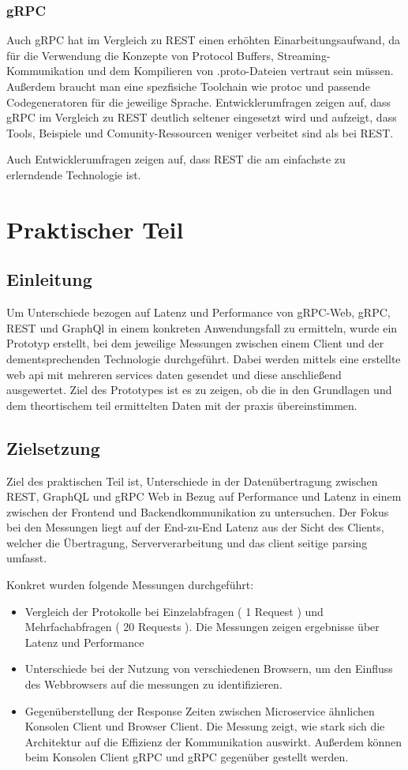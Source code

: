 \subsubsection{gRPC}
Auch gRPC hat im Vergleich zu REST einen erhöhten Einarbeitungsaufwand, da für die Verwendung die Konzepte von Protocol Buffers, Streaming-Kommunikation und dem Kompilieren von .proto-Dateien vertraut sein müssen. Außerdem braucht man eine spezfisiche Toolchain wie protoc und passende Codegeneratoren für die jeweilige Sprache. Entwicklerumfragen  zeigen auf, dass gRPC im Vergleich zu REST deutlich seltener eingesetzt wird und aufzeigt, dass Tools, Beispiele und Comunity-Ressourcen weniger verbeitet sind als bei REST.

Auch Entwicklerumfragen zeigen auf, dass REST die am einfachste zu erlerndende Technologie ist. 

\clearpage
\section{Praktischer Teil}
\subsection{Einleitung}
Um Unterschiede bezogen auf Latenz und Performance von gRPC-Web, gRPC, REST und GraphQl in einem konkreten Anwendungsfall zu ermitteln, wurde ein Prototyp erstellt, bei dem jeweilige Messungen zwischen einem Client und der dementsprechenden Technologie durchgeführt. Dabei werden mittels eine erstellte web api mit mehreren services daten gesendet und diese anschließend ausgewertet. Ziel des Prototypes ist es zu zeigen, ob die in den Grundlagen und dem theortischem teil ermittelten Daten mit der praxis übereinstimmen.

\subsection{Zielsetzung}
Ziel des praktischen Teil ist, Unterschiede in der Datenübertragung zwischen REST, GraphQL und gRPC Web in Bezug auf Performance und Latenz in einem zwischen der Frontend und Backendkommunikation zu untersuchen. Der Fokus bei den Messungen liegt auf der End-zu-End Latenz aus der Sicht des Clients, welcher die Übertragung, Serververarbeitung und das client seitige parsing umfasst. 

Konkret wurden folgende Messungen durchgeführt: 
\begin{itemize}
	\item Vergleich der Protokolle bei Einzelabfragen ( 1 Request ) und Mehrfachabfragen ( 20 Requests ). Die Messungen zeigen ergebnisse über Latenz und Performance
	\item Unterschiede bei der Nutzung von verschiedenen Browsern, um den Einfluss des Webbrowsers auf die messungen zu identifizieren.
	\item Gegenüberstellung der Response Zeiten zwischen Microservice ähnlichen Konsolen Client und Browser Client. Die Messung zeigt, wie stark sich die Architektur auf die Effizienz der Kommunikation auswirkt. Außerdem können beim Konsolen Client gRPC und gRPC gegenüber gestellt werden.
\end{itemize}

